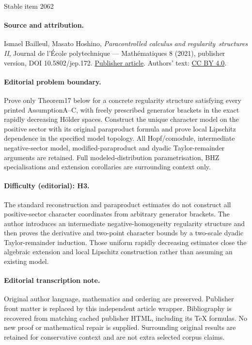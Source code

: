 \documentclass[11pt]{article}
\numberwithin{equation}{section}
\theoremstyle{plain}
\theoremstyle{definition}
\begin{document}
\begin{center}{\Large Stable item 2062}\end{center}
\paragraph{Source and attribution.}
Ismael Bailleul, Masato Hoshino, \emph{Paracontrolled calculus and regularity structures II}, Journal de l’École polytechnique — Mathématiques 8 (2021), publisher version, DOI 10.5802/jep.172. \href{https://jep.centre-mersenne.org/articles/10.5802/jep.172/}{Publisher article}. Authors' text: \href{https://creativecommons.org/licenses/by/4.0/}{CC BY 4.0}.
\paragraph{Editorial problem boundary.}
Prove only Theorem17 below for a concrete regularity structure satisfying every printed AssumptionA--C, with freely prescribed generator brackets in the exact rapidly decreasing Hölder spaces. Construct the unique character model on the positive sector with its original paraproduct formula and prove local Lipschitz dependence in the specified model topology. All Hopf/comodule, intermediate negative-sector model, modified-paraproduct and dyadic Taylor-remainder arguments are retained. Full modeled-distribution parametrisation, BHZ specialisations and extension corollaries are surrounding context only.
\paragraph{Difficulty (editorial): H3.}
The standard reconstruction and paraproduct estimates do not construct all positive-sector character coordinates from arbitrary generator brackets. The author introduces an intermediate negative-homogeneity regularity structure and then proves the derivative and two-point character bounds by a two-scale dyadic Taylor-remainder induction. Those uniform rapidly decreasing estimates close the algebraic extension and local Lipschitz construction rather than assuming an existing model.
\paragraph{Editorial transcription note.}
Original author language, mathematics and ordering are preserved. Publisher front matter is replaced by this independent article wrapper. Bibliography is recovered from matching cached publisher HTML, including its TeX formulas. No new proof or mathematical repair is supplied. Surrounding original results are retained for conservative context and are not extra selected corpus claims.
\clearpage
\end{document}
